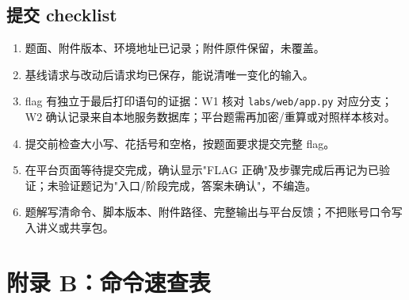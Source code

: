 \documentclass[UTF8,12pt,oneside]{ctexbook}
\begin{document}
\section{提交 checklist}
\begin{enumerate}[label=\arabic*.]
\item 题面、附件版本、环境地址已记录；附件原件保留，未覆盖。
\item 基线请求与改动后请求均已保存，能说清唯一变化的输入。
\item flag 有独立于最后打印语句的证据：W1 核对 \verb|labs/web/app.py| 对应分支；W2 确认记录来自本地服务数据库；平台题需再加密/重算或对照样本核对。
\item 提交前检查大小写、花括号和空格，按题面要求提交完整 flag。
\item 在平台页面等待提交完成，确认显示"FLAG 正确"及步骤完成后再记为已验证；未验证题记为"入口/阶段完成，答案未确认"，不编造。
\item 题解写清命令、脚本版本、附件路径、完整输出与平台反馈；不把账号口令写入讲义或共享包。
\end{enumerate}

\chapter{附录 B：命令速查表}
\label{web:cheatsheet}
\end{document}
